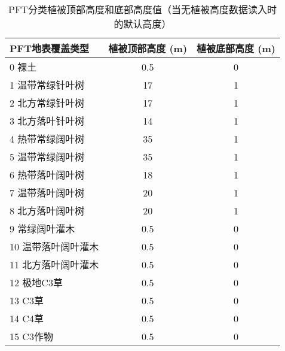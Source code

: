 \begin{table}[htbp]
  \centering
  \caption[PFT分类植被顶部高度和底部高度值]{PFT分类植被顶部高度和底部高度值（当无植被高度数据读入时的默认高度）}
  \label{tab:PFT分类植被顶部高度和底部高度值}
  \begin{tabular}{@{}lcc@{}}
    \toprule
    PFT地表覆盖类型     & 植被顶部高度 (m) & 植被底部高度 (m) \\ \midrule
    0 裸土              & 0.5              & 0                \\ %
    1 温带常绿针叶树    & 17               & 1                \\
    2 北方常绿针叶树    & 17               & 1                \\
    3 北方落叶针叶树    & 14               & 1                \\
    4 热带常绿阔叶树    & 35               & 1                \\
    5 温带常绿阔叶树    & 35               & 1                \\
    6 热带落叶阔叶树    & 18               & 1                \\
    7 温带落叶阔叶树    & 20               & 1                \\
    8 北方落叶阔叶树    & 20               & 1                \\
    9 常绿阔叶灌木      & 0.5              & 0                \\
    10 温带落叶阔叶灌木 & 0.5              & 0                \\
    11 北方落叶阔叶灌木 & 0.5              & 0                \\
    12 极地C3草         & 0.5              & 0                \\
    13 C3草             & 0.5              & 0                \\
    14 C4草             & 0.5              & 0                \\
    15 C3作物           & 0.5              & 0                \\ \bottomrule

  \end{tabular}
\end{table}

